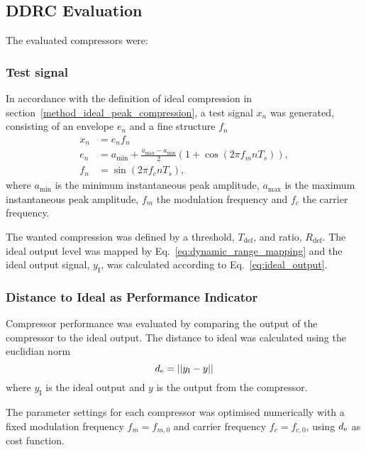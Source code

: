 \documentclass[../main2.tex]{subfiles}
\providecommand{\rootdir}{..}
\begin{document}
\subsection{DDRC Evaluation}\label{method_peak_compressors}
The evaluated compressors were:



\subsubsection{Test signal}\label{method_test_signal}
In accordance with the definition of ideal compression in section~\ref{method_ideal_peak_compression}, a test signal $x_n$ was generated, consisting of an envelope $e_n$ and a fine structure $f_n$
\begin{equation}
\begin{split}
	x_n &=e_nf_n\\
	e_n &= a_\text{min} + \frac{a_\text{max}- a_\text{min}}{2} \left(1 + \cos(2 \pi f_m n T_s) \right), \\
	f_n &= \sin(2 \pi f_c n T_s),
\end{split} \label{eq:test_signal}
\end{equation}
where $a_\text{min}$ is the minimum instantaneous peak amplitude, $a_\text{max}$ is the maximum instantaneous peak amplitude, $f_m$ the modulation frequency and $f_c$ the carrier frequency.

The wanted compression was defined by a threshold, $T_\text{def}$, and ratio, $R_\text{def}$. The ideal output level was mapped by Eq.~\eqref{eq:dynamic_range_mapping} and the ideal output signal, $y_\text{I}$, was calculated according to Eq.~\eqref{eq:ideal_output}.

\subsubsection{Distance to Ideal as Performance Indicator}\label{method_dist_ideal}
Compressor performance was evaluated by comparing the output of the compressor to the ideal output. The distance to ideal was calculated using the euclidian norm
\begin{equation}
d_\text{e} = ||y_\text{I} - y||
\end{equation}
where $y_\text{I}$ is the ideal output and $y$ is the output from the compressor.

The parameter settings for each compressor was optimised numerically with a fixed modulation frequency $f_m = f_{m,0}$ and carrier frequency $f_c = f_{c,0}$, using $d_\text{e}$ as cost function.
\end{document}
